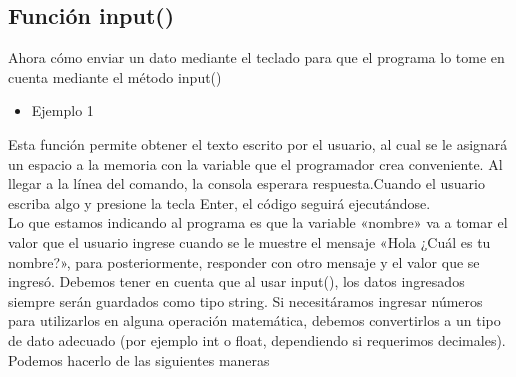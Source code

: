 \subsection{Función input()}
Ahora cómo enviar un dato mediante el teclado para que el programa lo tome en cuenta mediante el método input()

\begin{itemize}
    \item Ejemplo 1
    \begin{figure}[h]
        \centering
      \end{figure}
\end{itemize}

Esta función permite obtener el texto escrito por el usuario, al cual se le asignará un espacio a la memoria con la variable que el programador crea conveniente. Al llegar a la línea del comando, la consola esperara respuesta.Cuando el usuario escriba algo y presione la tecla Enter, el código seguirá ejecutándose.\\

Lo que estamos indicando al programa es que la variable «nombre» va a tomar el valor que el usuario ingrese cuando se le muestre el mensaje «Hola ¿Cuál es tu nombre?», para posteriormente, responder con otro mensaje y el valor que se ingresó. Debemos tener en cuenta que al usar input(), los datos ingresados siempre serán guardados como tipo string. Si necesitáramos ingresar números para utilizarlos en alguna operación matemática, debemos convertirlos a un tipo de dato adecuado (por ejemplo int o float, dependiendo si requerimos decimales). Podemos hacerlo de las siguientes maneras

\begin{figure}[h]
    \centering
  \end{figure}

